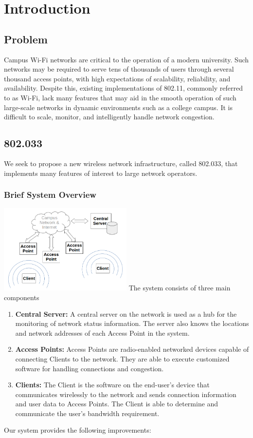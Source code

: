 \documentclass[11pt,twocolumn]{article}
\begin{document}
\maketitle

\section{Introduction}
\subsection{Problem}
\indent Campus Wi-Fi networks are critical to the operation of a modern university. Such networks may be required to serve tens of thousands of users
through several thousand access points, with high expectations of scalability, reliability, and availability. Despite this, existing 
implementations of 802.11, commonly referred to as Wi-Fi, lack many features that may aid in the smooth operation of such large-scale networks in dynamic 
environments such as a college campus. It is difficult to scale, monitor, and intelligently handle network congestion.
\subsection{802.033}
\indent We seek to propose a new wireless network infrastructure, called 802.033, that implements many features of interest to large network operators.
\subsubsection{Brief System Overview}
\includegraphics[width=0.5\textwidth]{overview}
\indent The system consists of three main components\\
\begin{enumerate}
	\item \textbf{Central Server:} A central server on the network is used as a hub for the monitoring of network status information. The server also knows
		the locations and network addresses of each Access Point in the system.
	\item \textbf{Access Points:} Access Points are radio-enabled networked devices capable of connecting Clients to the network. They are
		able to execute customized software for handling connections and congestion.
	\item \textbf{Clients:} The Client is the software on the end-user's device that communicates wirelessly to the network and sends connection information and
		user data to Access Points. The Client is able to determine and communicate the user's bandwidth requirement.
\end{enumerate}
\indent Our system provides the following improvements:\\
\end{document}
